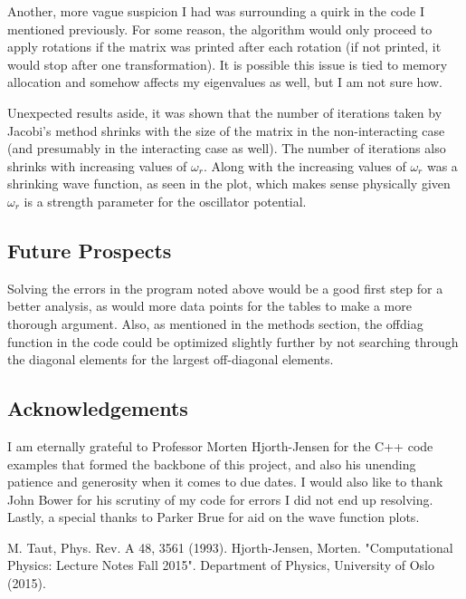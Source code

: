 \documentclass[10pt,showpacs,preprintnumbers,footinbib,amsmath,amssymb,aps,prl,twocolumn,groupedaddress,superscriptaddress,showkeys]{revtex4-1}
\begin{document}
Another, more vague suspicion I had was surrounding a quirk in the code I mentioned previously. For some reason, the algorithm would only proceed to apply rotations if the matrix was printed after each rotation (if not printed, it would stop after one transformation). It is possible this issue is tied to memory allocation and somehow affects my eigenvalues as well, but I am not sure how.

Unexpected results aside, it was shown that the number of iterations taken by Jacobi's method shrinks with the size of the matrix in the non-interacting case (and presumably in the interacting case as well). The number of iterations also shrinks with increasing values of $\omega_{r}$. Along with the increasing values of $\omega_{r}$ was a shrinking wave function, as seen in the plot, which makes sense physically given $\omega_{r}$ is a strength parameter for the oscillator potential.

	\subsection{Future Prospects}
	Solving the errors in the program noted above would be a good first step for a better analysis, as would more data points for the tables to make a more thorough argument. Also, as mentioned in the methods section, the offdiag function in the code could be optimized slightly further by not searching through the diagonal elements for the largest off-diagonal elements.

        \subsection{Acknowledgements}
        I am eternally grateful to Professor Morten Hjorth-Jensen for the C++ code examples that formed the backbone of this project, and also his unending patience and generosity when it comes to due dates. I would also like to thank John Bower for his scrutiny of my code for errors I did not end up resolving. Lastly, a special thanks to Parker Brue for aid on the wave function plots.

\begin{thebibliography}{9}
M. Taut, Phys. Rev. A 48, 3561 (1993).
Hjorth-Jensen, Morten. "Computational Physics: Lecture Notes Fall 2015". Department of Physics, University of Oslo (2015).
\end{thebibliography}
\end{document}
